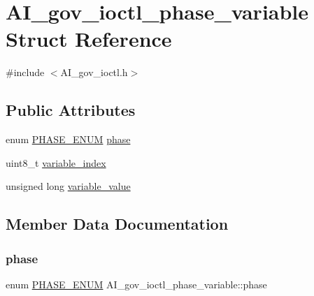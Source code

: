 \hypertarget{structAI__gov__ioctl__phase__variable}{}\section{A\+I\+\_\+gov\+\_\+ioctl\+\_\+phase\+\_\+variable Struct Reference}
\label{structAI__gov__ioctl__phase__variable}


{\ttfamily \#include $<$A\+I\+\_\+gov\+\_\+ioctl.\+h$>$}

\subsection*{Public Attributes}
\begin{DoxyCompactItemize}
\item 
enum \hyperlink{AI__gov__phases_8h_a59664fef4d2987410ea13b917756d6ac}{P\+H\+A\+S\+E\+\_\+\+E\+N\+UM} \hyperlink{structAI__gov__ioctl__phase__variable_a3c40338c439b69650dbcde778f36a874}{phase}
\item 
uint8\+\_\+t \hyperlink{structAI__gov__ioctl__phase__variable_a126c0069e00ca72b7b9ec758c702df2b}{variable\+\_\+index}
\item 
unsigned long \hyperlink{structAI__gov__ioctl__phase__variable_a6414166476d3b31d73f08c744cbfbf78}{variable\+\_\+value}
\end{DoxyCompactItemize}


\subsection{Member Data Documentation}
\mbox{\label{structAI__gov__ioctl__phase__variable_a3c40338c439b69650dbcde778f36a874}} 
\subsubsection{\texorpdfstring{phase}{phase}}
{\footnotesize\ttfamily enum \hyperlink{AI__gov__phases_8h_a59664fef4d2987410ea13b917756d6ac}{P\+H\+A\+S\+E\+\_\+\+E\+N\+UM} A\+I\+\_\+gov\+\_\+ioctl\+\_\+phase\+\_\+variable\+::phase}

\mbox{\label{structAI__gov__ioctl__phase__variable_a126c0069e00ca72b7b9ec758c702df2b}} 
